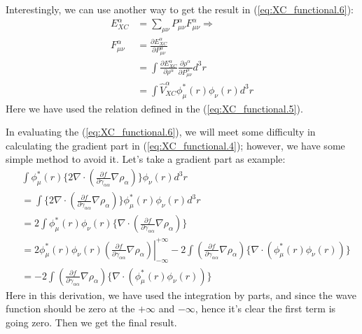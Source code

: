 Interestingly, we can use another way to get the result in
(\ref{eq:XC_functional.6}):
\begin{align}
  \label{eq:XC_functional.9}
E^{\alpha}_{XC} &= \sum_{\mu\nu}P^{\alpha}_{\mu\nu}F^{\alpha}_{\mu\nu}
\Rightarrow \nonumber \\
F^{\alpha}_{\mu\nu} &= \frac{\partial E^{\alpha}_{XC}}{\partial P^{\alpha}_{\mu\nu}}
\nonumber \\
&=
\int \frac{\partial E^{\alpha}_{XC}}{\partial
  \rho^{\alpha}}\frac{\partial \rho^{\alpha}}{\partial P^{\alpha}_{\mu\nu}} d^{3}r
\nonumber \\
&= \int \hat{V}^{\alpha}_{XC} \phi^{*}_{\mu}(r)\phi_{\nu}(r) d^{3}r
\end{align}
Here we have used the relation defined in the (\ref{eq:XC_functional.5}).

In evaluating the (\ref{eq:XC_functional.6}), we will meet some
difficulty in calculating the gradient part in
(\ref{eq:XC_functional.4}); however, we have some simple method to
avoid it. Let's take a gradient part as example:
\begin{equation}
  \label{eq:XC_functional.7}
  \begin{split}
    & \int \phi^{*}_{\mu}(r) \Bigg\{2\nabla\cdot \left( \frac{\partial
        f} {\partial \gamma_{\alpha\alpha}}
      \nabla\rho_{\alpha}\right)\Bigg\}\phi_{\nu}(r) d^{3}r  \\
    &=\int \Bigg\{2\nabla\cdot \left( \frac{\partial f} {\partial
        \gamma_{\alpha\alpha}}
      \nabla\rho_{\alpha}\right)\Bigg\}\phi^{*}_{\mu}(r) \phi_{\nu}(r)
    d^{3}r  \\
    &= 2\int \phi^{*}_{\mu}(r) \phi_{\nu}(r)\Bigg\{ \nabla \cdot\left(
      \frac{\partial f} {\partial \gamma_{\alpha\alpha}}
      \nabla\rho_{\alpha}\right) \Bigg\} \\
    &= 2\phi^{*}_{\mu}(r) \phi_{\nu}(r)\left. \left( \frac{\partial f}
        {\partial \gamma_{\alpha\alpha}}
        \nabla\rho_{\alpha}\right)\right|^{+\infty}_{-\infty} - 2\int
    \left( \frac{\partial f} {\partial \gamma_{\alpha\alpha}}
      \nabla\rho_{\alpha}\right)\Big\{\nabla\cdot(\phi^{*}_{\mu}(r) \phi_{\nu}(r))\Big\} \\
    &= - 2\int \left( \frac{\partial f} {\partial
        \gamma_{\alpha\alpha}}
      \nabla\rho_{\alpha}\right)\Big\{\nabla\cdot(\phi^{*}_{\mu}(r)
    \phi_{\nu}(r))\Big\}
  \end{split}
\end{equation}
Here in this derivation, we have used the integration by parts, and
since the wave function should be zero at the $+\infty$ and $-\infty$,
hence it's clear the first term is going zero. Then we get the final
result. 

